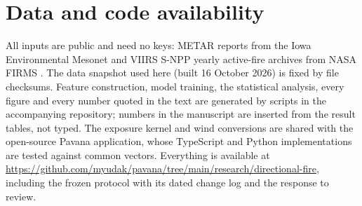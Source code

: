 \section*{Data and code availability}

All inputs are public and need no keys: METAR reports from the Iowa Environmental Mesonet
\citep{iem} and VIIRS S-NPP yearly active-fire archives from NASA FIRMS \citep{firms}. The data
snapshot used here (built 16 October 2026) is fixed by file checksums. Feature construction, model
training, the statistical analysis, every figure and every number quoted in the text are
generated by scripts in the accompanying repository; numbers in the manuscript are inserted from
the result tables, not typed. The exposure kernel and wind conversions are shared with the
open-source Pavana application, whose TypeScript and Python implementations are tested against
common vectors. Everything is available at
\url{https://github.com/myudak/pavana/tree/main/research/directional-fire}, including the frozen
protocol with its dated change log and the response to review.
